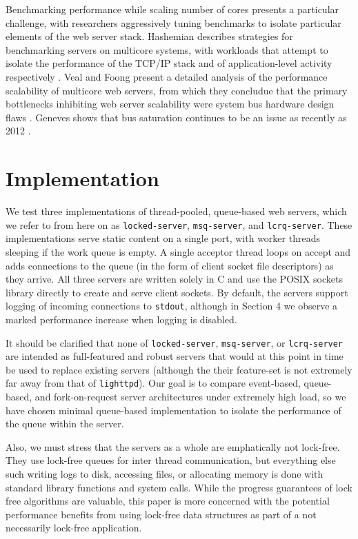 \documentclass[twoside,10pt]{article}
\begin{document}
\begin{multicols}{2}
Benchmarking performance while scaling number of cores presents a
particular challenge, with researchers aggressively tuning benchmarks
to isolate particular elements of the web server stack. Hashemian
describes strategies for benchmarking servers on multicore systems,
with workloads that attempt to isolate the performance of the TCP/IP
stack and of application-level activity respectively
\cite{hashemian2013improving}. Veal and Foong present a detailed
analysis of the performance scalability of multicore web servers, from
which they concludue that the primary bottlenecks inhibiting web
server scalability were system bus hardware design flaws
\cite{veal2007performance}. Geneves shows that bus saturation
continues to be an issue as recently as 2012
\cite{geneves2012analysis}.

\section{Implementation}

We test three implementations of thread-pooled, queue-based web
servers, which we refer to from here on as \verb+locked-server+,
\verb+msq-server+, and \verb+lcrq-server+. These implementations serve
static content on a single port, with worker threads sleeping if the
work queue is empty. A single acceptor thread loops on accept and adds
connections to the queue (in the form of client socket file
descriptors) as they arrive. All three servers are written solely in C
and use the POSIX sockets library directly to create and serve client
sockets. By default, the servers support logging of incoming
connections to \verb+stdout+, although in Section 4 we observe a
marked performance increase when logging is disabled.

It should be clarified that none of \verb+locked-server+,
\verb+msq-server+, or \verb+lcrq-server+ are intended as full-featured
and robust servers that would at this point in time be used to replace
existing servers (although the their feature-set is not extremely far
away from that of \verb+lighttpd+). Our goal is to compare
event-based, queue-based, and fork-on-request server architectures
under extremely high load, so we have chosen minimal queue-based
implementation to isolate the performance of the queue within the
server.

Also, we must stress that the servers as a whole are emphatically not
lock-free. They use lock-free queues for inter thread communication,
but everything else such writing logs to disk, accessing files, or
allocating memory is done with standard library functions and system
calls. While the progress guarantees of lock free algorithms are
valuable, this paper is more concerned with the potential performance
benefits from using lock-free data structures as part of a
not necessarily lock-free application.


\end{multicols}
\end{document}
